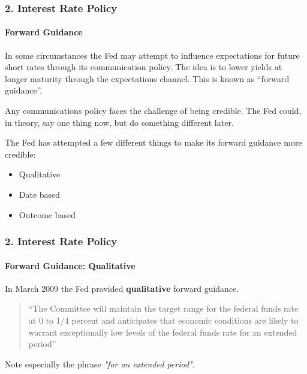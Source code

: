 \documentclass{beamer}
\begin{document}
\begin{frame}[t]
    \frametitle{2. Interest Rate Policy}
    \framesubtitle{Forward Guidance}

    In some circumstances the Fed may attempt to influence expectations for future short rates through its communication policy.  The idea is to lower yields at longer maturity through the expectations channel.  This is known as “forward guidance”.   
    \vspace{1em}
    
    Any communications policy faces the challenge of being credible.   The Fed could, in theory, say one thing now, but do something different later.
    \vspace{1em}

    
    The Fed has attempted a few different things to make its forward guidance more credible:
    \begin{itemize}
        \item Qualitative
        \item Date based
        \item Outcome based
    \end{itemize}

\end{frame}

\begin{frame}[t]
    \frametitle{2. Interest Rate Policy}
    \framesubtitle{Forward Guidance: Qualitative}

    In March 2009 the Fed provided \textbf{qualitative} forward guidance.
    \vspace{1em}

    \begin{quote}
     “The Committee will maintain the target range for the federal funds rate at 0 to 1/4 percent and anticipates that economic conditions are likely to warrant exceptionally low levels of the federal funds rate for an extended period”
    \end{quote}
    \vspace{1em}

    Note especially the phrase \textit{"for an extended period"}.

\end{frame}
\end{document}
